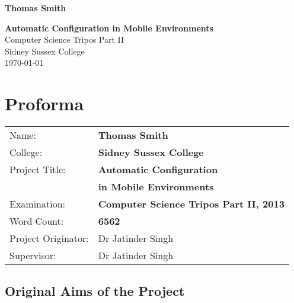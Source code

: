 \documentclass[12pt,twoside,notitlepage]{report}
\begin{document}





\pagestyle{empty}

\hfill{\LARGE \bf Thomas Smith}

\vspace*{60mm}
\begin{center}
\Huge
{\bf Automatic Configuration in Mobile Environments} \\
\vspace*{5mm}
Computer Science Tripos Part II \\
\vspace*{5mm}
Sidney Sussex College \\
\vspace*{5mm}
\today  %
\end{center}

\cleardoublepage


\setcounter{page}{1}
\pagestyle{plain}

\chapter*{Proforma}

{\large
\begin{tabular}{ll}
Name:               & \bf Thomas Smith	\\
College:            & \bf Sidney Sussex College	\\
Project Title:      & \bf Automatic Configuration \\ &\bf in Mobile Environments	\\
Examination:        & \bf Computer Science Tripos Part II, 2013 	\\
Word Count:         & \bf 6562\footnotemark[1] \\
Project Originator: & Dr Jatinder Singh		\\
Supervisor:         & Dr Jatinder Singh		\\ 
\end{tabular}
}



\section*{Original Aims of the Project}
\end{document}

